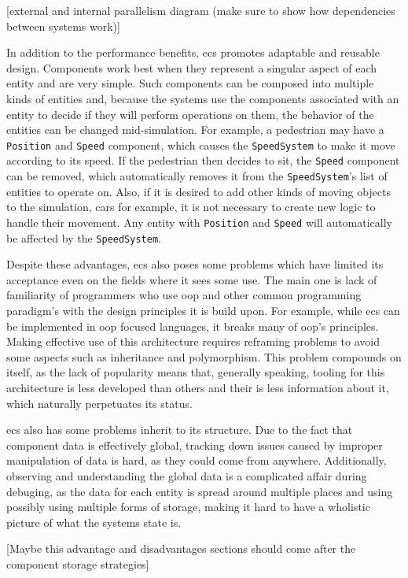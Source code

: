 \documentclass[twoside, 11pt]{article}
\begin{document}
[external and internal parallelism diagram (make sure to show how dependencies between systems work)]

In addition to the performance benefits, \gls{ecs} promotes adaptable and reusable design. Components work best when they represent a singular aspect of each entity and are very simple. Such components can be composed into multiple kinds of entities and, because the systems use the components associated with an entity to decide if they will perform operations on them, the behavior of the entities can be changed mid-simulation. For example, a pedestrian may have a \verb|Position| and \verb|Speed| component, which causes the \verb|SpeedSystem| to make it move according to its speed. If the pedestrian then decides to sit, the \verb|Speed| component can be removed, which automatically removes it from the \verb|SpeedSystem|'s list of entities to operate on. Also, if it is desired to add other kinds of moving objects to the simulation, cars for example, it is not necessary to create new logic to handle their movement. Any entity with \verb|Position| and \verb|Speed| will automatically be affected by the \verb|SpeedSystem|.

Despite these advantages, \gls{ecs} also poses some problems which have limited its acceptance even on the fields where it sees some use. The main one is lack of familiarity of programmers who use \gls{oop} and other common programming paradigm's with the design principles it is build upon. For example, while \gls{ecs} can be implemented in \gls{oop} focused languages, it breaks many of \gls{oop}'s principles. Making effective use of this architecture requires reframing problems to avoid some aspects such as inheritance and polymorphism. This problem compounds on itself, as the lack of popularity means that, generally speaking, tooling for this architecture is less developed than others and their is less information about it, which naturally perpetuates its status.

\gls{ecs} also has some problems inherit to its structure. Due to the fact that component data is effectively global, tracking down issues caused by improper manipulation of data is hard, as they could come from anywhere. Additionally, observing and understanding the global data is a complicated affair during debuging, as the data for each entity is spread around multiple places and using possibly using multiple forms of storage, making it hard to have a wholistic picture of what the systems state is.

[Maybe this advantage and disadvantages sections should come after the component storage strategies]
\end{document}

